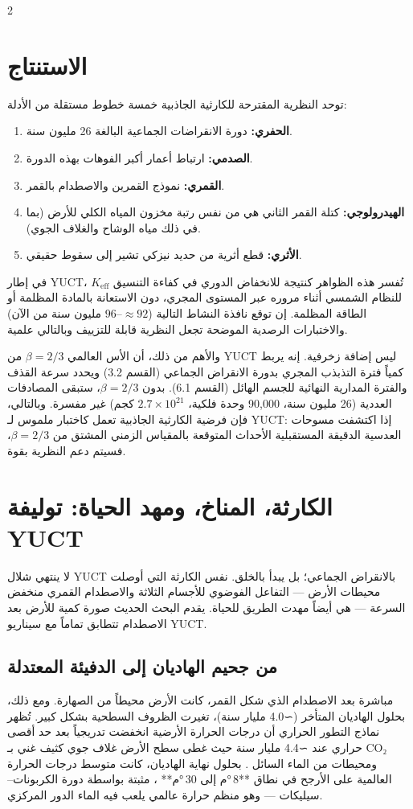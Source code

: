 \documentclass[11pt,a4paper]{article}
\begin{document}
	\begin{multicols}{2}
		
		\section{الاستنتاج}
		توحد النظرية المقترحة للكارثية الجاذبية خمسة خطوط مستقلة من الأدلة:
		\begin{enumerate}
			\item \textbf{الحفري:} دورة الانقراضات الجماعية البالغة 26 مليون سنة.
			\item \textbf{الصدمي:} ارتباط أعمار أكبر الفوهات بهذه الدورة.
			\item \textbf{القمري:} نموذج القمرين والاصطدام بالقمر.
			\item \textbf{الهيدرولوجي:} كتلة القمر الثاني هي من نفس رتبة مخزون المياه الكلي للأرض (بما في ذلك مياه الوشاح والغلاف الجوي).
			\item \textbf{الأثري:} قطع أثرية من حديد نيزكي تشير إلى سقوط حقيقي.
		\end{enumerate}
		في إطار YUCT، تُفسر هذه الظواهر كنتيجة للانخفاض الدوري في كفاءة التنسيق \(K_{\mathrm{eff}}\) للنظام الشمسي أثناء مروره عبر المستوى المجري، دون الاستعانة بالمادة المظلمة أو الطاقة المظلمة. إن توقع نافذة النشاط التالية (\(\approx 92\)–\(96\) مليون سنة من الآن) والاختبارات الرصدية الموضحة تجعل النظرية قابلة للتزييف وبالتالي علمية.
		
		والأهم من ذلك، أن الأس العالمي \(\beta = 2/3\) من YUCT ليس إضافة زخرفية. إنه يربط كمياً فترة التذبذب المجري بدورة الانقراض الجماعي (القسم 3.2) ويحدد سرعة القذف والفترة المدارية النهائية للجسم الهائل (القسم 6.1). بدون \(\beta = 2/3\)، ستبقى المصادفات العددية (26 مليون سنة، 90,000 وحدة فلكية، \(2.7\times10^{21}\) كجم) غير مفسرة. وبالتالي، فإن فرضية الكارثية الجاذبية تعمل كاختبار ملموس لـ YUCT: إذا اكتشفت مسوحات العدسية الدقيقة المستقبلية الأحداث المتوقعة بالمقياس الزمني المشتق من \(\beta = 2/3\)، فسيتم دعم النظرية بقوة.
		
		\section{الكارثة، المناخ، ومهد الحياة: توليفة YUCT}
		لا ينتهي شلال YUCT بالانقراض الجماعي؛ بل يبدأ بالخلق. نفس الكارثة التي أوصلت محيطات الأرض — التفاعل الفوضوي للأجسام الثلاثة والاصطدام القمري منخفض السرعة — هي أيضاً مهدت الطريق للحياة. يقدم البحث الحديث صورة كمية للأرض بعد الاصطدام تتطابق تماماً مع سيناريو YUCT.
		
		\subsection{من جحيم الهاديان إلى الدفيئة المعتدلة}
		مباشرة بعد الاصطدام الذي شكل القمر، كانت الأرض محيطاً من الصهارة. ومع ذلك، بحلول الهاديان المتأخر (∼4.0 مليار سنة)، تغيرت الظروف السطحية بشكل كبير. تُظهر نماذج التطور الحراري أن درجات الحرارة الأرضية انخفضت تدريجياً بعد حد أقصى حراري عند ∼4.4 مليار سنة حيث غطى سطح الأرض غلاف جوي كثيف غني بـ CO₂ ومحيطات من الماء السائل \cite{Korenaga2017}. بحلول نهاية الهاديان، كانت متوسط درجات الحرارة العالمية على الأرجح في نطاق **8 °م إلى 30 °م** \cite{Charnay2017}، مثبتة بواسطة دورة الكربونات–سيليكات — وهو منظم حرارة عالمي يلعب فيه الماء الدور المركزي.
		

\end{multicols}
\end{document}
